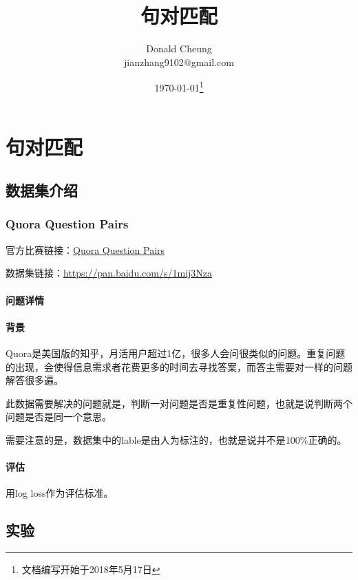 \ifx\projectsnotes\undefined
    \providecommand{\notesroot}{../..}
    \providecommand{\sentencepairroot}{.}

    \title{句对匹配}
    \author{Donald Cheung\\jianzhang9102@gmail.com}
    \date{\today\footnote{文档编写开始于2018年5月17日}}

    
\else
    \providecommand{\sentencepairroot}{\projectsroot/sentence_pair_classification}
\fi

\chapter{句对匹配}

\section{数据集介绍}

\subsection{Quora Question Pairs}
官方比赛链接：\href{https://www.kaggle.com/c/quora-question-pairs}{Quora Question Pairs}

数据集链接：\url{https://pan.baidu.com/s/1mij3Nza}

\subsubsection{问题详情}
\subsubsection{背景}
Quora是美国版的知乎，月活用户超过1亿，很多人会问很类似的问题。重复问题的出现，会使得信息需求者花费更多的时间去寻找答案，而答主需要对一样的问题解答很多遍。

此数据需要解决的问题就是，判断一对问题是否是重复性问题，也就是说判断两个问题是否是同一个意思。

需要注意的是，数据集中的lable是由人为标注的，也就是说并不是100\%正确的。

\subsubsection{评估}
用log loss作为评估标准。

\section{实验}

